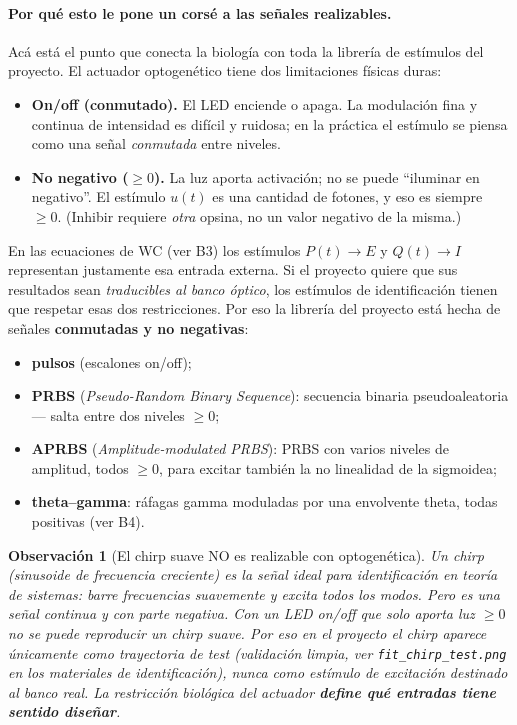 \documentclass[11pt,a4paper]{article}
\newtheorem{remark}{Observación}
\begin{document}
\paragraph{Por qué esto le pone un corsé a las señales realizables.} Acá está el punto que conecta la biología con toda la librería de estímulos del proyecto. El actuador optogenético tiene dos limitaciones físicas duras:
\begin{itemize}[leftmargin=1.4em]
  \item \textbf{On/off (conmutado).} El LED enciende o apaga. La modulación fina y continua de intensidad es difícil y ruidosa; en la práctica el estímulo se piensa como una señal \emph{conmutada} entre niveles.
  \item \textbf{No negativo ($\geq 0$).} La luz aporta activación; no se puede ``iluminar en negativo''. El estímulo $u(t)$ es una cantidad de fotones, y eso es siempre $\geq 0$. (Inhibir requiere \emph{otra} opsina, no un valor negativo de la misma.)
\end{itemize}

En las ecuaciones de WC (ver B3) los estímulos $P(t)\to E$ y $Q(t)\to I$ representan justamente esa entrada externa. Si el proyecto quiere que sus resultados sean \emph{traducibles al banco óptico}, los estímulos de identificación tienen que respetar esas dos restricciones. Por eso la librería del proyecto está hecha de señales \textbf{conmutadas y no negativas}:
\begin{itemize}[leftmargin=1.4em]
  \item \textbf{pulsos} (escalones on/off);
  \item \textbf{PRBS} (\emph{Pseudo-Random Binary Sequence}): secuencia binaria pseudoaleatoria --- salta entre dos niveles $\geq 0$;
  \item \textbf{APRBS} (\emph{Amplitude-modulated PRBS}): PRBS con varios niveles de amplitud, todos $\geq 0$, para excitar también la no linealidad de la sigmoidea;
  \item \textbf{theta--gamma}: ráfagas gamma moduladas por una envolvente theta, todas positivas (ver B4).
\end{itemize}

\begin{remark}[El chirp suave NO es realizable con optogenética]
Un \emph{chirp} (sinusoide de frecuencia creciente) es la señal ideal para identificación en teoría de sistemas: barre frecuencias suavemente y excita todos los modos. Pero es una señal \emph{continua y con parte negativa}. Con un LED on/off que solo aporta luz $\geq 0$ no se puede reproducir un chirp suave. Por eso en el proyecto el chirp aparece \emph{únicamente como trayectoria de test} (validación limpia, ver \texttt{fit\_chirp\_test.png} en los materiales de identificación), nunca como estímulo de excitación destinado al banco real. La restricción biológica del actuador \textbf{define qué entradas tiene sentido diseñar}.
\end{remark}
\end{document}
